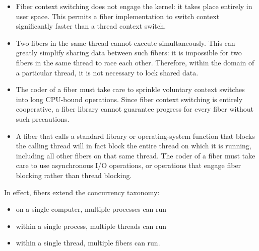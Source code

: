 \begin{itemize}
    \item Fiber context switching does not engage the kernel: it takes place entirely
          in user space. This permits a fiber implementation to switch context
          significantly faster than a thread context switch.
    \item Two fibers in the same thread cannot execute simultaneously. This can
          greatly simplify sharing data between such fibers: it is impossible for two
          fibers in the same thread to race each other. Therefore, within the domain
          of a particular thread, it is not necessary to lock shared data.
    \item The coder of a fiber must take care to sprinkle voluntary context switches
          into long CPU-bound operations. Since fiber context switching is entirely
          cooperative, a fiber library cannot guarantee progress for every fiber
          without such precautions.
    \item A fiber that calls a standard library or operating-system function that
          blocks the calling thread will in fact block the entire thread on which it
          is running, including all other fibers on that same thread. The coder of a
          fiber must take care to use asynchronous I/O operations, or operations that
          engage fiber blocking rather than thread blocking.
\end{itemize}

In effect, fibers extend the concurrency taxonomy:
\begin{itemize}
    \item on a single computer, multiple processes can run
    \item within a single process, multiple threads can run
    \item within a single thread, multiple fibers can run.
\end{itemize}

